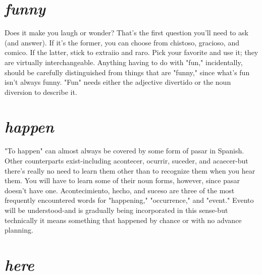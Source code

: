 \section{\emph{funny}}

Does it make you laugh or wonder? That's the first question
you'll need to ask (and answer). If it's the former, you can choose from
chistoso, gracioso, and comico. If the latter, stick to extraiio and raro.
Pick your favorite and use it; they are virtually interchangeable. Anything having to do with "fun," incidentally, should be carefully distinguished from things that are "funny," since what's fun isn't always
funny. "Fun" needs either the adjective divertido or the noun diversion to describe it.

\section{\emph{happen}}

"To happen" can almost always be covered by some form of
pasar in Spanish. Other counterparts exist-including acontecer, ocurrir, suceder, and acaecer-but there's really no need to learn them
other than to recognize them when you hear them. You will have to
learn some of their noun forms, however, since pasar doesn't have one.
Acontecimiento, hecho, and suceso are three of the most frequently
encountered words for "happening," "occurrence," and "event."
Evento will be understood-and is gradually being incorporated in this
sense-but technically it means something that happened by chance
or with no advance planning.

\section{\emph{here}}

